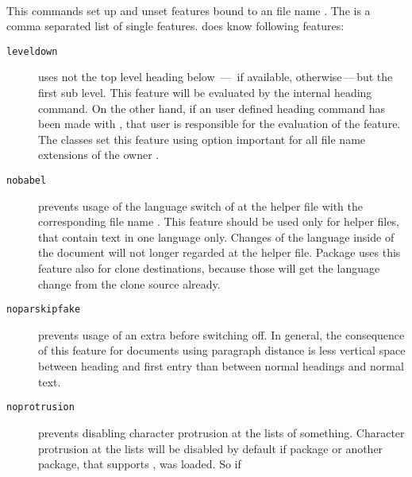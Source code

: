 \begin{Declaration}
  \\
\end{Declaration}
%
%
This commands set up and unset features bound to an file name
. The  is a comma separated list of
single features.  does know following features:
\begin{description}
\item[\texttt{leveldown}] uses not the top level heading below
  \,---\, if available, 
  otherwise\,---\,but the first sub level. This feature will be evaluated by
  the internal heading command. On the other hand, if an user defined heading
  command has been made with , that user is responsible
  for the evaluation of the feature. The \KOMAScript{} classes set this
  feature using option
  important{}%
   for all file name extensions of the
  owner .
\item[\texttt{nobabel}] prevents usage of the language switch of
   at the helper file with the
  corresponding file name . This feature should be used only
  for helper files, that contain text in one language only. Changes of the
  language inside of the document will not longer regarded at the helper
  file. Package
   uses
  this feature also for clone destinations, because those will get the
  language change from the clone source already.
\item[\texttt{noparskipfake}] prevents
  usage of an extra  before switching  off. In
  general, the consequence of this feature for documents using paragraph
  distance is less vertical space between heading and first entry than between
  normal headings and normal text.
\item[\texttt{noprotrusion}] prevents
  disabling character protrusion at the lists of something. Character
  protrusion at the lists will be disabled by default if package
   or another package, that
  supports , was loaded. So if

\end{description}
